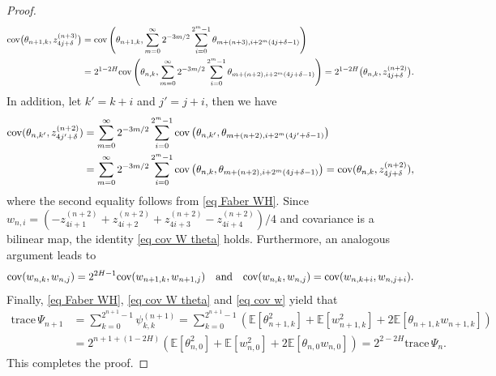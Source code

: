\documentclass[12pt,reqno]{article}
\def\trace#1{\text{trace}\, #1}
\numberwithin{equation}{section}
\def\cov{\mbox{cov}}
\def\var{\mbox{var}}
\theoremstyle{definition}
\def\cov{\hbox{\rm cov}}\def\var{\text{\rm Var}}
\newcommand{\bE}{\mathbb{E}}
\begin{document}
\begin{proof}
\begin{equation*}
		\begin{split}
			\cov\big(\theta_{n+1,k}, z^{(n+3)}_{4j+\delta}\big)
			&= \cov\left(\theta_{n+1,k},\sum_{m = 0}^\infty 2^{-3m/2}\sum_{i= 0}^{2^{m}-1} \theta_{m+(n+3),i+2^{m}(4j+\delta-1)}\right)\\
			&= 2^{1-2H}\cov\left(\theta_{n,k},\sum_{m = 0}^\infty 2^{-3m/2}\sum_{i = 0}^{2^{m}-1} \theta_{m+(n+2),i+2^{m}(4j+\delta-1)}\right) = 2^{1-2H}\big(\theta_{n,k}, z^{(n+2)}_{4j+\delta}\big).
		\end{split}
	\end{equation*}
	In addition, let $k' = k + i$ and $j' = j+i$, then we have 
	\begin{equation*}
		\begin{split}
			\cov(\theta_{n,k'}, z^{(n+2)}_{4j'+\delta}) 	&= \sum_{m = 0}^\infty 2^{-3m/2}\sum_{i = 0}^{2^{m}-1}\cov\left(\theta_{n,k'}, \theta_{m+(n+2),i+2^{m}(4j'+\delta-1)}\right)\\
			&=  \sum_{m = 0}^\infty 2^{-3m/2}\sum_{i = 0}^{2^{m}-1}\cov\left(\theta_{n,k}, \theta_{m+(n+2),i+2^{m}(4j+\delta-1)}\right) = \cov(\theta_{n,k}, z^{(n+2)}_{4j+\delta}),\\
		\end{split}
	\end{equation*} 
	where the second equality follows from \eqref{eq Faber WH}. Since $w_{n,i} = (-z^{(n+2)}_{4i+1}+z^{(n+2)}_{4i+2}+z^{(n+2)}_{4i+3}-z^{(n+2)}_{4i+4})/4$ and covariance is a bilinear map, the identity \eqref{eq cov W theta} holds. Furthermore, an analogous argument leads to 
	\begin{equation}\label{eq cov w}
		\cov(w_{n,k}, w_{n,j}) = 2^{2H-1}\cov(w_{n+1,k}, w_{n+1,j}) \quad \text{and} \quad \cov(w_{n,k}, w_{n,j}) = \cov(w_{n,k+i}, w_{n,j+i}).
	\end{equation}
	Finally, \eqref{eq Faber WH}, \eqref{eq cov W theta} and \eqref{eq cov w} yield that 
	\begin{equation*}
		\begin{split}
			\trace \Psi_{n+1} &= \sum_{k = 0}^{2^{n+1}-1} \psi^{(n+1)}_{k,k} = \sum_{k = 0}^{2^{n+1}-1}\left(\bE\left[\theta^2_{n+1,k}\right] + \bE\left[w^2_{n+1,k}\right] + 2\bE\left[\theta_{n+1,k}w_{n+1,k}\right]\right)\\&= 2^{n+1+(1-2H)}\left(\bE\left[\theta^2_{n,0}\right]+\bE\left[w^2_{n,0}\right]+2\bE\left[\theta_{n,0}w_{n,0}\right]\right) = 2^{2-2H}\trace \Psi_{n}.
		\end{split}
	\end{equation*}
	This completes the proof. 
\end{proof}
\end{document}
